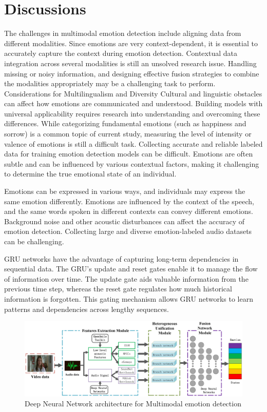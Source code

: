 \documentclass[conference]{IEEEtran}
\begin{document}
\section{Discussions}
The challenges in multimodal emotion detection include aligning data from different modalities.
Since emotions are very context-dependent, it is essential to accurately capture the context during emotion detection. Contextual data integration across several modalities is still an unsolved research issue.
Handling missing or noisy information, and designing effective fusion strategies to combine the modalities appropriately may be a challenging task to perform. \cite{liang2020semi}
Considerations for Multilingualism and Diversity Cultural and linguistic obstacles can affect how emotions are communicated and understood. Building models with universal applicability requires research into understanding and overcoming these differences.
While categorizing fundamental emotions (such as happiness and sorrow) is a common topic of current study, measuring the level of intensity or valence of emotions is still a difficult task.
Collecting accurate and reliable labeled data for training emotion detection models can be difficult. Emotions are often subtle and can be influenced by various contextual factors, making it challenging to determine the true emotional state of an individual.

Emotions can be expressed in various ways, and individuals may express the same emotion differently. Emotions are influenced by the context of the speech, and the same words spoken in different contexts can convey different emotions. Background noise and other acoustic disturbances can affect the accuracy of emotion detection. Collecting large and diverse emotion-labeled audio datasets can be challenging.

\cite{jia2022multimodal} GRU networks have the advantage of capturing long-term dependencies in sequential data. The GRU's update and reset gates enable it to manage the flow of information over time. The update gate aids valuable information from the previous time step, whereas the reset gate regulates how much historical information is forgotten. This gating mechanism allows GRU networks to learn patterns and dependencies across lengthy sequences.

\begin{figure}
\centerline{\includegraphics[scale=0.07]{DNN.png}}
\caption{Deep Neural Network architecture for Multimodal emotion detection \cite{s19122730}}
\end{figure}
\end{document}
